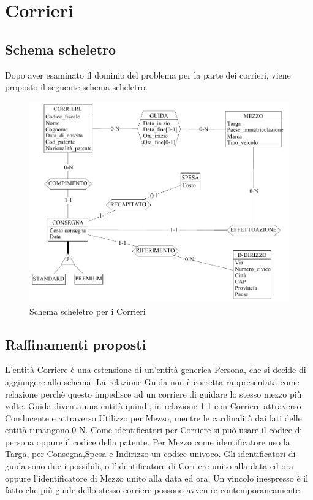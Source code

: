 \documentclass[a4paper,12pt]{report}
\begin{document}
\section{Corrieri}
\subsection{Schema scheletro}
Dopo aver esaminato il dominio del problema per la parte dei corrieri, viene proposto il seguente schema scheletro.
\begin{figure}[h]
	\centering{}
	\includegraphics[width=\textwidth]{img/SchemaConcettuale-Corrieri1.pdf}
	\caption{Schema scheletro per i Corrieri}
\end{figure}
\subsection{Raffinamenti proposti}
L'entità Corriere è una estensione di un'entità generica Persona, che si decide di aggiungere allo schema. 
La relazione Guida non è corretta rappresentata come relazione perchè questo impedisce ad un corriere di guidare lo stesso mezzo più volte. 
Guida diventa una entità quindi, in relazione 1-1 con Corriere attraverso Conducente e attraverso Utilizzo per Mezzo, mentre le cardinalità dai lati delle entità rimangono 0-N. 
Come identificatori per Corriere si può usare il codice di persona oppure il codice della patente. 
Per Mezzo come identificatore uso la Targa, per Consegna,Spesa e Indirizzo un codice univoco. 
Gli identificatori di guida sono due i possibili, o l'identificatore di Corriere unito alla data ed ora oppure l'identificatore di Mezzo unito alla data ed ora. 
Un vincolo inespresso è il fatto che più guide dello stesso corriere possono avvenire contemporaneamente. 
\end{document}
